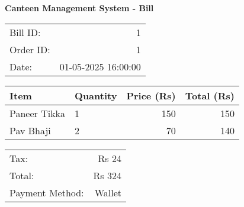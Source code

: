 \documentclass[a4paper,12pt]{article}
\begin{document}
\centering
\textbf{Canteen Management System - Bill}\\
\vspace{0.5cm}
\begin{tabular}{lr}
Bill ID: & 1 \\
Order ID: & 1 \\
Date: & 01-05-2025 16:00:00 \\
\end{tabular}
\vspace{0.5cm}
\begin{tabular}{llrr}
\toprule
Item & Quantity & Price (Rs) & Total (Rs) \\
\midrule
Paneer Tikka & 1 & \num{150} & \num{150} \\
Pav Bhaji & 2 & \num{70} & \num{140} \\
\bottomrule
\end{tabular}
\vspace{0.5cm}
\begin{tabular}{lr}
Tax: & Rs \num{24} \\
Total: & Rs \num{324} \\
Payment Method: & Wallet \\
\end{tabular}
\end{document}

